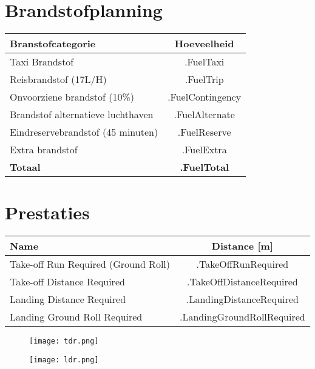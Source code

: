 \documentclass[12pt]{article}
\begin{document}
\newpage
\section*{Brandstofplanning}
{\small
\begin{table}[H]
    \centering
    \renewcommand{\arraystretch}{1.5}
    \setlength{\tabcolsep}{10pt}
    \begin{tabular}{|l|c|}
        \hline
        \rowcolor[HTML]{AAAAAA}
        \textbf{Branstofcategorie} & \textbf{Hoeveelheid} \\ \hline
        Taxi Brandstof & {{ .FuelTaxi }}           \\ \hline
        Reisbrandstof (17L/H) & {{ .FuelTrip }}           \\ \hline
        Onvoorziene brandstof (10\%) & {{ .FuelContingency }}           \\ \hline
        Brandstof alternatieve luchthaven & {{ .FuelAlternate }}           \\ \hline
        Eindreservebrandstof (45 minuten) & {{ .FuelReserve }}           \\ \hline
        Extra brandstof & {{ .FuelExtra }}           \\ \hline
        \rowcolor[HTML]{AAAAAA}
        \textbf{Totaal} & \textbf{ {{ .FuelTotal }} } \\ \hline
    \end{tabular}
\end{table}
}

\section*{Prestaties}
{\small
\begin{table}[H]
    \centering
    \renewcommand{\arraystretch}{1.5}
    \setlength{\tabcolsep}{10pt}
    \begin{tabular}{|l|c|}
        \hline
        \rowcolor[HTML]{AAAAAA}
        \textbf{Name} & \textbf{Distance [m]} \\ \hline
        Take-off Run Required (Ground Roll) & {{ .TakeOffRunRequired }} \\ \hline
        Take-off Distance Required & {{ .TakeOffDistanceRequired }} \\ \hline
        Landing Distance Required & {{ .LandingDistanceRequired }} \\ \hline
        Landing Ground Roll Required & {{ .LandingGroundRollRequired }} \\ \hline
    \end{tabular}
\end{table}
}

\newpage
\begin{figure}[H]
    \centering
    \texttt{[image: tdr.png]}
\end{figure}

\begin{figure}[H]
    \centering
    \texttt{[image: ldr.png]}
\end{figure}
\end{document}
